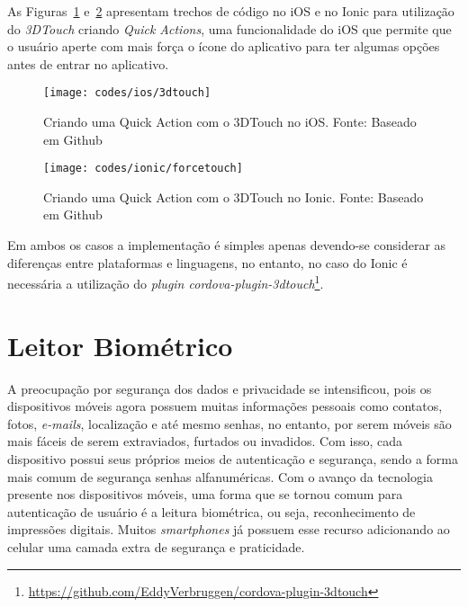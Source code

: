 As Figuras~\ref{fig:3dtouch-ios} e~\ref{fig:forcetouch-ionic} apresentam trechos de código no iOS e no Ionic para utilização do \textit{3DTouch} criando \textit{Quick Actions}, uma funcionalidade do iOS que permite 
que o usuário aperte com mais força o ícone do aplicativo para ter algumas opções antes de entrar no aplicativo.

\begin{figure}[H]
	\centering
	\texttt{[image: codes/ios/3dtouch]}
	\caption[Criando uma Quick Action com o 3DTouch no iOS.]{Criando uma Quick Action com o 3DTouch no iOS. Fonte: Baseado em Github\protect\footnotemark}
	\label{fig:3dtouch-ios}
\end{figure}
\begin{figure}[H]
	\centering
	\texttt{[image: codes/ionic/forcetouch]}
	\caption[Criando uma Quick Action com o 3DTouch no Ionic]{Criando uma Quick Action com o 3DTouch no Ionic. Fonte: Baseado em Github\protect\footnotemark}
	\label{fig:forcetouch-ionic}
\end{figure}

Em ambos os casos a implementação é simples apenas devendo-se considerar as diferenças entre plataformas e linguagens, no entanto, no caso do Ionic é necessária a utilização do 
\textit{plugin cordova-plugin-3dtouch}\footnote{\url{https://github.com/EddyVerbruggen/cordova-plugin-3dtouch}}. 

\section{Leitor Biométrico} \label{subsubsec:biometrico}
A preocupação por segurança dos dados e privacidade se intensificou, pois os dispositivos móveis agora possuem muitas informações pessoais como contatos, fotos, \textit{e-mails}, localização e até mesmo senhas, no entanto,
por serem móveis são mais fáceis de serem extraviados, furtados ou invadidos. Com isso, cada dispositivo possui seus próprios meios de autenticação e segurança, sendo a forma mais comum de segurança senhas alfanuméricas. 
Com o avanço da tecnologia presente nos dispositivos móveis, uma forma que se tornou comum para autenticação de usuário é a leitura biométrica, ou seja, reconhecimento de impressões digitais. Muitos \textit{smartphones} 
já possuem esse recurso adicionando ao celular uma camada extra de segurança e praticidade. 


